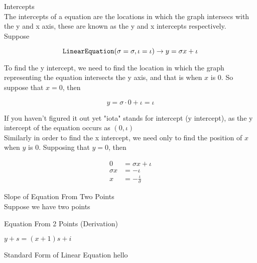 \documentclass{book}
\begin{document}
  {\remark Intercepts \\
    The intercepts of a equation are the locations in which the graph intersecs with the y and x axis, these are known as the y and x intercepts respectively.\\

    Suppose

    $$\text{\texttt{LinearEquation}}(\sigma = \sigma, \iota = \iota) \to y = \sigma x + \iota$$

    To find the y intercept, we need to find the location in which the graph representing the equation intersects the y axis, and that is when $x$ is $0$. So suppose that $x = 0$, then

    $$y = \sigma \cdot 0 + \iota = \iota$$

    If you haven't figured it out yet "iota" stands for intercept (y intercept), as the y intercept of the equation occurs as $(0, \iota)$\\

    Similarly in order to find the x intercept, we need only to find the position of $x$ when $y$ is $0$. Supposing that $y = 0$, then

    \begin{align*}
      0 & = \sigma x + \iota\\
      \sigma x & = -\iota\\
      x & = -\frac{\iota}{\sigma}
    \end{align*}
  }

  {\example Slope of Equation From Two Points \\
    Suppose we have two points
  }



  {\remark Equation From 2 Points (Derivation)

    $y + s = (x + 1)s + i$
  }


  {\remark Standard Form of Linear Equation 
    hello
  }
\end{document}
